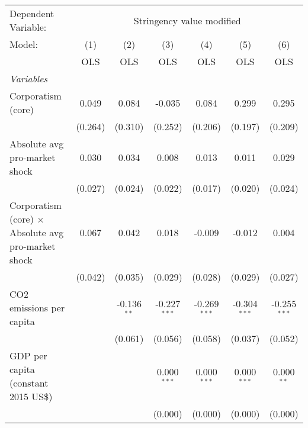 
\begingroup
\centering
\begin{tabular}{lcccccc}
   \toprule
   Dependent Variable: & \multicolumn{6}{c}{Stringency value modified}\\
   Model:                                                     & (1)     & (2)           & (3)            & (4)            & (5)            & (6)\\  
                                                              &  OLS    & OLS           & OLS            & OLS            & OLS            & OLS\\  
   \midrule
   \emph{Variables}\\
   Corporatism (core)                                         & 0.049   & 0.084         & -0.035         & 0.084          & 0.299          & 0.295\\   
                                                              & (0.264) & (0.310)       & (0.252)        & (0.206)        & (0.197)        & (0.209)\\   
   Absolute avg pro-market shock                              & 0.030   & 0.034         & 0.008          & 0.013          & 0.011          & 0.029\\   
                                                              & (0.027) & (0.024)       & (0.022)        & (0.017)        & (0.020)        & (0.024)\\   
   Corporatism (core) $\times$ Absolute avg pro-market shock  & 0.067   & 0.042         & 0.018          & -0.009         & -0.012         & 0.004\\   
                                                              & (0.042) & (0.035)       & (0.029)        & (0.028)        & (0.029)        & (0.027)\\   
   CO2 emissions per capita                                   &         & -0.136$^{**}$ & -0.227$^{***}$ & -0.269$^{***}$ & -0.304$^{***}$ & -0.255$^{***}$\\   
                                                              &         & (0.061)       & (0.056)        & (0.058)        & (0.037)        & (0.052)\\   
   GDP per capita (constant 2015 US\$)                        &         &               & 0.000$^{***}$  & 0.000$^{***}$  & 0.000$^{***}$  & 0.000$^{**}$\\   
                                                              &         &               & (0.000)        & (0.000)        & (0.000)        & (0.000)\\   

\end{tabular}
